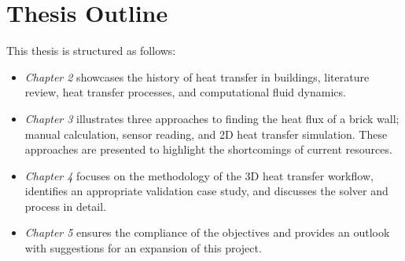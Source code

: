 \section{Thesis Outline}
This thesis is structured as follows:
\begin{itemize}
    \item \textit{Chapter 2} showcases the history of heat transfer in buildings, literature review, heat transfer processes, and computational fluid dynamics.
    \item \textit{Chapter 3} illustrates three approaches to finding the heat flux of a brick wall; manual calculation, sensor reading, and 2D heat transfer simulation. These approaches are presented to highlight the shortcomings of current resources. 
    \item \textit{Chapter 4} focuses on the methodology of the 3D heat transfer workflow, identifies an appropriate validation case study, and discusses the solver and process in detail.
    \item \textit{Chapter 5} ensures the compliance of the objectives and provides an outlook with suggestions for an expansion of this project.
\end{itemize}